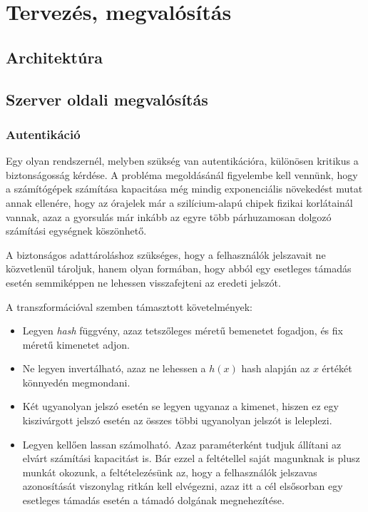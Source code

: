 \chapter{Tervezés, megvalósítás}

\section{Architektúra}

\section{Szerver oldali megvalósítás}

\subsection{Autentikáció}

Egy olyan rendszernél, melyben szükség van autentikációra, különösen kritikus a
biztonságosság kérdése. A probléma megoldásánál figyelembe kell vennünk, hogy a
számítógépek számítása kapacitása még mindig exponenciális növekedést mutat
annak ellenére, hogy az órajelek már a szilícium-alapú chipek fizikai
korlátainál vannak, azaz a gyorsulás már inkább az egyre több párhuzamosan
dolgozó számítási egységnek köszönhető.

A biztonságos adattároláshoz szükséges, hogy a felhasználók jelszavait ne
közvetlenül tároljuk, hanem olyan formában, hogy abból egy esetleges támadás
esetén semmiképpen ne lehessen visszafejteni az eredeti jelszót.

A transzformációval szemben támasztott követelmények:

\begin{itemize}
  \item Legyen \emph{hash} függvény, azaz tetszőleges méretű bemenetet fogadjon,
    és fix méretű kimenetet adjon.
  \item Ne legyen invertálható, azaz ne lehessen a $h(x)$ hash alapján az $x$
    értékét könnyedén megmondani.
  \item Két ugyanolyan jelszó esetén se legyen ugyanaz a kimenet, hiszen ez egy
    kiszivárgott jelszó esetén az összes többi ugyanolyan jelszót is leleplezi.
  \item Legyen kellően lassan számolható. Azaz paraméterként tudjuk állítani az
    elvárt számítási kapacitást is. Bár ezzel a feltétellel saját magunknak is
    plusz munkát okozunk, a feltételezésünk az, hogy a felhasználók jelszavas
    azonosítását viszonylag ritkán kell elvégezni, azaz itt a cél elsősorban egy
    esetleges támadás esetén a támadó dolgának megnehezítése.
\end{itemize}

